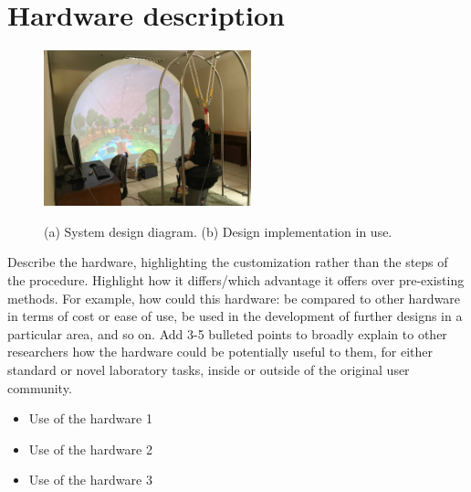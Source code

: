 \section{Hardware description}



\begin{figure}
		\begin{minipage}[b]{11cm}
			\subcaptionbox{}
			{}
		\end{minipage}
		\begin{minipage}[b]{4cm}
			\subcaptionbox{}
			{\includegraphics[height=4.5cm]{figs/FotoSystem}}%
		\end{minipage}%
		\caption
		{%
			(a) System design diagram. (b) Design implementation in use.
			\label{Fig1Horse}%
		}%
\end{figure}

Describe the hardware, highlighting the customization rather than the steps of the procedure. Highlight how it differs/which advantage it offers over pre-existing methods. For example, how could this hardware: be compared to other hardware in terms of cost or ease of use, be used in the development of further designs in a particular area, and so on. \linebreak \linebreak Add 3-5 bulleted points to broadly explain to other researchers how the hardware could be potentially useful to them, for either standard or novel laboratory tasks, inside or outside of the original user community.
\begin{itemize}[noitemsep, topsep=-2pt]
\item Use of the hardware 1
\item Use of the hardware 2
\item Use of the hardware 3
\end{itemize}

